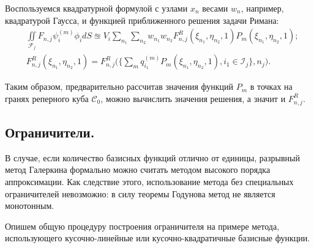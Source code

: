 \documentclass[14pt, a4paper, fleqn]{extreport}
\begin{document}
	Воспользуемся квадратурной формулой с узлами $x_n$ весами $w_n$,
	например, квадратурой Гаусса, и функцией приближенного решения задачи Римана:
	\begin{equation*}
	\begin{split}
		&\iint\limits_{\mathcal{F}_j} F_{n,j} \psi_i^{(m)} \phi_i dS
			\approxeq V_i \sum\limits_{n_1} 
				\sum\limits_{n_2} w_{n_1} w_{n_2} 
					F_{n,j}^R(\xi_{n_1},\eta_{n_2},1) P_m(\xi_{n_1},\eta_{n_2},1); \\
		&F_{n,j}^R(\xi_{n_1},\eta_{n_2},1) 
			= F_{n,j}^R \Big( \Big\lbrace \sum\limits_m q_{i_1}^{(m)} 
				P_m(\xi_{n_1},\eta_{n_2},1), i_1 \in \mathcal{I}_j \Big\rbrace, n_{j} \Big).
	\end{split}
	\end{equation*}
	
	Таким образом, предварительно рассчитав значения функций $P_m$
	в точках на гранях реперного куба $\mathcal{C}_0$, можно вычислить значения решения,
	а значит и $F_{n,j}^R$.
	
	\subsection{Ограничители.}

	В случае, если количество базисных функций отлично от единицы, 
	разрывный метод Галеркина формально можно считать методом высокого порядка аппроксимации.
	Как следствие этого, использование метода без специальных ограничителей невозможно:
	в силу теоремы Годунова метод не является монотонным.
	
	Опишем общую процедуру построения ограничителя на примере метода,
	использующего кусочно-линейные или кусочно-квадратичные базисные функции.
	
\end{document}

